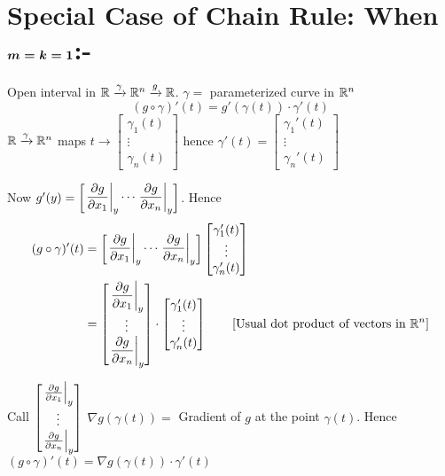 \section{Special Case of Chain Rule: When $\boldsymbol{m=k=1}$:-}
Open interval in $\mathbb{R}\xrightarrow{\gamma}\mathbb{R}^n\xrightarrow{g}\mathbb{R}$. $\gamma=$ parameterized curve in $\mathbb{R}^n$
$$(g\circ \gamma)'(t)=g'(\gamma(t))\cdot \gamma'(t)$$ ${\mathbb{R}\xrightarrow{\gamma}\mathbb{R}^n}$ maps $t\to\begin{bmatrix}\gamma_1(t)\\ \vdots\\ \gamma_n(t)	\end{bmatrix}$ hence $\gamma'(t)=\begin{bmatrix}
		\gamma_1'(t) \\ \vdots\\ \gamma_n'(t)
	\end{bmatrix}$

Now $g'(y)=\begin{bmatrix}
		\left.\dfrac{\partial g}{\partial x_1}\right|_y\cdots \left.\dfrac{\partial g}{\partial x_n}\right|_y
	\end{bmatrix}$. Hence \begin{align*}
	(g\circ \gamma)'(t) & = \begin{bmatrix}
		                        \left.\dfrac{\partial g}{\partial x_1}\right|_y\cdots \left.\dfrac{\partial g}{\partial x_n}\right|_y
	                        \end{bmatrix}\begin{bmatrix}
		                                     \gamma_1'(t) \\ \vdots\\ \gamma_n'(t)
	                                     \end{bmatrix}                                  \\
	                    & = \begin{bmatrix}
		                        \left.\dfrac{\partial g}{\partial x_1}\right|_y \\ \vdots \\ \left.\dfrac{\partial g}{\partial x_n}\right|_y
	                        \end{bmatrix}\cdot \begin{bmatrix}
		                                           \gamma_1'(t) \\ \vdots\\ \gamma_n'(t)
	                                           \end{bmatrix}\qquad[\text{Usual dot product of vectors in }\mathbb{R}^n] \\
\end{align*}
\pagebreak

Call $\begin{bmatrix}
		\left.\frac{\partial g}{\partial x_1}\right|_y \\ \vdots \\ \left.\frac{\partial g}{\partial x_n}\right|_y
	\end{bmatrix}$ $\nabla g(\gamma(t))=$ Gradient of $g$ at the point $\gamma(t)$. Hence $(g\circ\gamma)'(t)=\nabla g(\gamma(t))\cdot\gamma'(t)$


